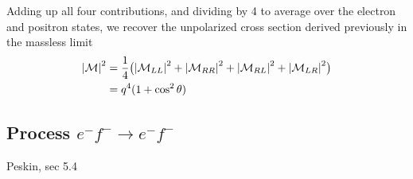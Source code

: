 \documentclass[TheoreticalPhy_ModB.tex]{subfiles}
\begin{document}
Adding up all four contributions, and dividing by 4 to average over the electron and positron states, we recover the unpolarized cross section derived previously in the massless limit
\[
\begin{split}
\abs{\mathcal{M}}^2 	& = \frac{1}{4} \bigl( \abs{\mathcal{M}_{LL}}^2 + \abs{\mathcal{M}_{RR}}^2 
	+ \abs{\mathcal{M}_{RL}}^2 + \abs{\mathcal{M}_{LR}}^2 \bigr) \\
				& = q^4(1 + \cos^2 \theta)
\end{split}
\]

\subsection{Process $e^-f^-\to e^-f^-$}\label{sec:crossing-symmetries}
\textsf{Peskin, sec 5.4}\\
\end{document}
